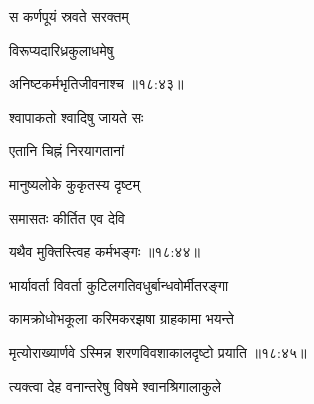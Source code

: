 \ujvers{}

\nemslokab

{\devanagarifontbold स कर्णपूयं स्रवते सरक्तम्  \danda\dontdisplaylinenum }%
 
\nemslokac

{\devanagarifontbold विरूप्यदारिध्रकुलाधमेषु }%
  \dontdisplaylinenum

\nemslokad

{\devanagarifontbold अनिष्टकर्मभृतिजीवनाश्च {॥१८:४३॥} \veg\dontdisplaylinenum }%
 
\ujvers{}

\nemslokab

{\devanagarifontbold श्वापाकतो श्वादिषु जायते सः  \danda\dontdisplaylinenum }%
 
\nemslokac

{\devanagarifontbold एतानि चिह्नं निरयागतानां }%
  \dontdisplaylinenum

\nemslokab

{\devanagarifontbold मानुष्यलोके कुकृतस्य दृष्टम्  \danda\dontdisplaylinenum }%
 
\nemslokae

{\devanagarifontbold समासतः कीर्तित एव देवि }%
  \dontdisplaylinenum

\nemslokad

{\devanagarifontbold यथैव मुक्तिस्त्विह कर्मभङ्गः {॥१८:४४॥} \veg\dontdisplaylinenum }%
 
\ujvers{}

\nemslokab

{\devanagarifontbold भार्यावर्ता विवर्ता कुटिलगतिवधुर्बान्धवोर्मीतरङ्गा  \danda\dontdisplaylinenum }%
 
\nemslokac

{\devanagarifontbold कामक्रोधोभकूला करिमकरझषा ग्राहकामा भयन्ते }%
  \dontdisplaylinenum

\nemslokad

{\devanagarifontbold मृत्योराख्यार्णवे ऽस्मिन्न शरणविवशाकालदृष्टो प्रयाति {॥१८:४५॥} \veg\dontdisplaylinenum }%
 
\ujvers{}

\nemslokab

{\devanagarifontbold त्यक्त्वा देह वनान्तरेषु विषमे श्वानश्रिगालाकुले  \danda\dontdisplaylinenum }%
 
